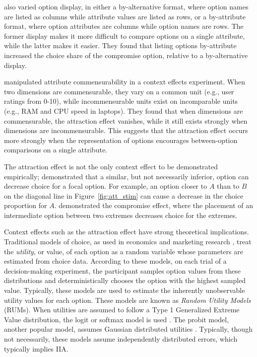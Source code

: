 \textcite{changWhichCompromiseOption2008} also varied option display, in either a by-alternative format, where option names are listed as columns while attribute values are listed as rows, or a by-attribute format, where option attributes are columns while option names are rows. The former display makes it more difficult to compare options on a single attribute, while the latter makes it easier. They found that listing options by-attribute increased the choice share of the compromise option, relative to a by-alternative display. 

\textcite{hayes2024attribute} manipulated attribute commensurability in a context effects experiment. When two dimensions are commensurable, they vary on a common unit (e.g., user ratings from 0-10), while incommensurable units exist on incomparable units (e.g., RAM and CPU speed in laptops). They found that when dimensions are commensurable, the attraction effect vanishes, while it still exists strongly when dimensions are incommensurable. This suggests that the attraction effect occurs more strongly when the representation of options encourages between-option comparisons on a single attribute.

The attraction effect is not the only context effect to be demonstrated empirically; \textcite{tverskyEliminationAspectsTheory1972} demonstrated that a similar, but not necessarily inferior, option can decrease choice for a focal option. For example, an option closer to $A$ than to $B$ on the diagonal line in Figure~\ref{fig:att_stim} can cause a decrease in the choice proportion for $A$. \textcite{simonsonChoiceBasedReasons1989b} demonstrated the compromise effect, where the placement of an intermediate option between two extremes decreases choice for the extremes. 

Context effects such as the attraction effect have strong theoretical implications. Traditional models of choice, as used in economics and marketing research \parencite{mcfadden2001economic}, treat the \textit{utility}, or value, of each option as a random variable whose parameters are estimated from choice data. According to these models, on each trial of a decision-making experiment, the participant samples option values from these distributions and deterministically chooses the option with the highest sampled value. Typically, these models are used to estimate the inherently unobservable utility values for each option. These models are known as \textit{Random Utility Models} (RUMs). When utilities are assumed to follow a Type 1 Generalized Extreme Value distribution, the logit or softmax model is used \parencite{gensch1979multinomial}. The probit model, another popular model, assumes Gaussian distributed utilities \parencite{bolduc1999practical}. Typically, though not necessarily, these models assume independently distributed errors, which typically implies IIA. 

